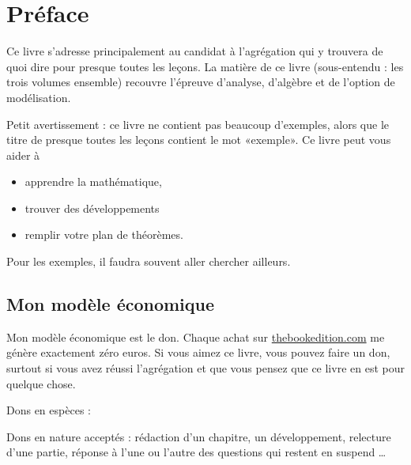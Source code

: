 
\section{Préface}

Ce livre s'adresse principalement au candidat à l'agrégation qui y trouvera de quoi dire pour presque toutes les leçons. La matière de ce livre (sous-entendu : les trois volumes ensemble) recouvre l'épreuve d'analyse, d'algèbre et de l'option de modélisation.

Petit avertissement : ce livre ne contient pas beaucoup d'exemples, alors que le titre de presque toutes les leçons contient le mot «exemple». Ce livre peut vous aider à
\begin{itemize}
    \item apprendre la mathématique,
    \item trouver des développements
    \item remplir votre plan de théorèmes.
\end{itemize}
Pour les exemples, il faudra souvent aller chercher ailleurs.

\subsection*{Mon modèle économique}

Mon modèle économique est le don. Chaque achat sur \href{http://www.thebookedition.com/fr/}{thebookedition.com} me génère exactement zéro euros. Si vous aimez ce livre, vous pouvez faire un don, surtout si vous avez réussi l'agrégation et que vous pensez que ce livre en est pour quelque chose.

Dons en espèces :


Dons en nature acceptés : rédaction d'un chapitre, un développement, relecture d'une partie, réponse à l'une ou l'autre des questions qui restent en suspend \ldots
